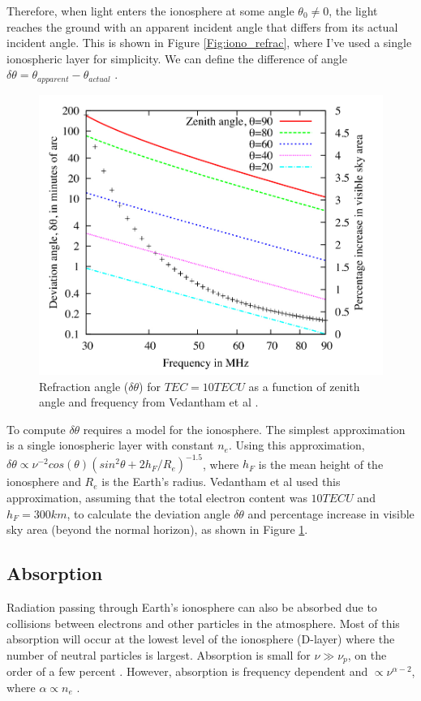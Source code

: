 Therefore, when light enters the ionosphere at some angle $\theta_0 \neq 0$, the light reaches the ground with an apparent incident angle that differs from its actual incident angle. This is shown in Figure \ref{Fig:iono_refrac}, where I've used a single ionospheric layer for simplicity. We can define the difference of angle $\delta \theta = \theta_{apparent}-\theta_{actual}$ \cite{thompson_2001}.


\begin{figure}[htb]
\begin{center}
\includegraphics[width=0.95\linewidth]{Ionosphere/figures/refraction_impact.jpg}
\caption{Refraction angle ($\delta \theta$) for $TEC= 10 TECU$ as a function of zenith angle and frequency from Vedantham et al \cite{vedantham_2014}.}
\label{Fig:refrac_est}
\end{center}
\end{figure} 

To compute $\delta \theta$ requires a model for the ionosphere. The simplest approximation is a single ionospheric layer with constant $n_e$. Using this approximation, $\delta \theta \propto \nu^{-2} cos(\theta)(sin^2 \theta + 2 h_F/R_e)^{-1.5}$, where $h_F$ is the mean height of the ionosphere and $R_e$ is the Earth's radius. Vedantham et al \cite{vedantham_2014} used this approximation, assuming that the total electron content was $10 TECU$ and $h_F = 300 km$, to calculate the deviation angle $\delta \theta$ and percentage increase in visible sky area (beyond the normal horizon), as shown in Figure \ref{Fig:refrac_est}. 

\subsection{Absorption}
Radiation passing through Earth's ionosphere can also be absorbed due to collisions between electrons and other particles in the atmosphere. Most of this absorption will occur at the lowest level of the ionosphere (D-layer) where the number of neutral particles is largest. Absorption is small for $\nu \gg \nu_p$, on the order of a few percent \cite{vedantham_2014}. However, absorption is frequency dependent and $\propto \nu^{\alpha -2}$, where $\alpha \propto n_e$ \cite{thompson_2001}. 

